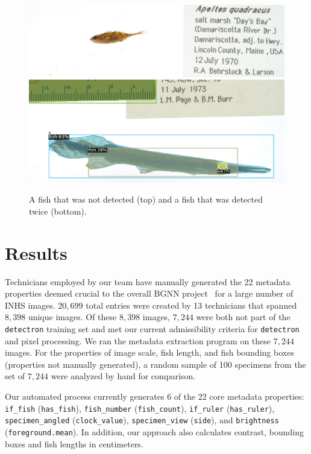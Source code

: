 \documentclass[conference]{IEEEtran}
\begin{document}
\begin{figure}[t]
  \centering
  \includegraphics[width=0.9\linewidth]{images/none1_crop} \\
  \vspace{5mm}
  \includegraphics[width=0.9\linewidth]{images/double1_crop}
  \caption{A fish that was not detected (top) and a fish that was detected twice (bottom).}
  \label{fig:fish_detect_wrong}
\end{figure}

\section{Results}
Technicians employed by our team have manually generated the 22 metadata properties deemed crucial to the overall BGNN project~\cite{leipzig2021biodiversity} for a large number of INHS images. \(20,699\) total entries were created by 13 technicians that spanned \(8,398\) unique images. Of these \(8,398\) images, \(7,244\) were both not part of the \verb|detectron| training set and met our current admissibility criteria for \verb|detectron| and pixel processing. We ran the metadata extraction program on these \(7,244\) images.
For the properties of image scale, fish length, and fish bounding boxes
(properties not manually generated),
a random sample of 100 specimens from the set of \(7,244\) were analyzed by
hand for comparison.

Our automated process currently generates 6 of the 22 core metadata properties: \verb|if_fish| (\verb|has_fish|), \verb|fish_number| (\verb|fish_count|), \verb|if_ruler| (\verb|has_ruler|), \verb|specimen_angled| (\verb|clock_value|), \verb|specimen_view| (\verb|side|), and \verb|brightness| (\verb|foreground.mean|).
In addition, our approach also calculates contrast, bounding boxes and
fish lengths in centimeters.
\end{document}
